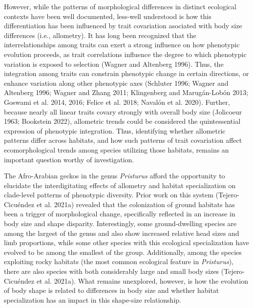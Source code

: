\documentclass[
  11pt,
]{article}
\begin{document}
However, while the patterns of morphological differences in distinct
ecological contexts have been well documented, less-well understood is
how this differentiation has been influenced by trait covariation
asociated with body size differences (i.e., allometry). It has long been
recognized that the interrelationships among traits can exert a strong
influence on how phenotypic evolution proceeds, as trait correlations
influence the degree to which phenotypic variation is exposed to
selection (Wagner and Altenberg 1996). Thus, the integration among
traits can constrain phenotypic change in certain directions, or enhance
variation along other phenotypic axes (Schluter 1996; Wagner and
Altenberg 1996; Wagner and Zhang 2011; Klingenberg and Marugán-Lobón
2013; Goswami et al. 2014, 2016; Felice et al. 2018; Navalón et al.
2020). Further, because nearly all linear traits covary strongly with
overall body size (Jolicoeur 1963; Bookstein 2022), allometric trends
could be considered the quintessential expression of phenotypic
integration. Thus, identifying whether allometric patterns differ across
habitats, and how such patterns of trait covariation affect
ecomorphological trends among species utilizing those habitats, remains
an important question worthy of investigation. \hfill\break

The Afro-Arabian geckos in the genus \emph{Pristurus} afford the
opportunity to elucidate the interdigitating effects of allometry and
habitat specialization on clade-level patterns of phenotypic diversity.
Prior work on this system (Tejero-Cicuéndez et al. 2021a) revealed that
the colonization of ground habitats has been a trigger of morphological
change, specifically reflected in an increase in body size and shape
disparity. Interestingly, some ground-dwelling species are among the
largest of the genus and also show increased relative head sizes and
limb proportions, while some other species with this ecological
specialization have evolved to be among the smallest of the group.
Additionally, among the species exploiting rocky habitats (the most
common ecological feature in \emph{Pristurus}), there are also species
with both considerably large and small body sizes (Tejero-Cicuéndez et
al. 2021a). What remains unexplored, however, is how the evolution of
body shape is related to differences in body size and whether habitat
specialization has an impact in this shape-size relationship.
\hfill\break
\end{document}
